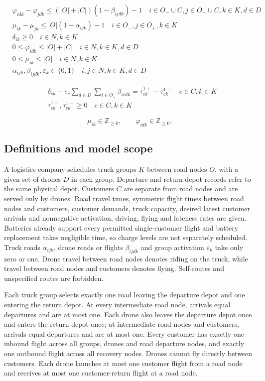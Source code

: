 \documentclass[10pt]{article}
\begin{document}
\begin{align}
& \varphi_{i d k}-\varphi_{j d k} \leq(|O|+|C|)(1-\beta_{i j d k})-1 \quad i \in O_{-} \cup C, j \in O_{+} \cup C, k \in K, d \in D \\
& \mu_{i k}-\mu_{j k} \leq|O|(1-\alpha_{i j k})-1 \quad i \in O_{-}, j \in O_{+}, k \in K \\
& \delta_{i k} \geq 0 \quad i \in N, k \in K \\
& 0 \leq \varphi_{i d k} \leq|O|+|C| \quad i \in N, k \in K, d \in D \\
& 0 \leq \mu_{i k} \leq|O| \quad i \in N, k \in K \\
& \alpha_{i j k}, \beta_{i j d k}, \varepsilon_{k} \in\{0,1\} \quad i, j \in N, k \in K, d \in D
\end{align}

\begin{align}
& \delta_{ck} - e_{c} \sum_{d \in D} \sum_{i \in O_{-}} \beta_{icdk} = \tau_{ck}^{1+} - \tau_{ck}^{1-} \quad c \in C, k \in K \\
& \tau_{ck}^{1+}, \tau_{ck}^{1-} \ge 0 \quad c \in C, k \in K
\end{align}

\[
\mu_{ik}\in\mathbb Z_{\ge0},\qquad \varphi_{idk}\in\mathbb Z_{\ge0}.
\]

\subsection*{Definitions and model scope}
A logistics company schedules truck groups $K$ between road nodes $O$, with a given set of drones $D$ in each group. Departure and return depot records refer to the same physical depot. Customers $C$ are separate from road nodes and are served only by drones. Road travel times, symmetric flight times between road nodes and customers, customer demands, truck capacity, desired latest customer arrivals and nonnegative activation, driving, flying and lateness rates are given. Batteries already support every permitted single-customer flight and battery replacement takes negligible time, so charge levels are not separately scheduled. Truck roads $\alpha_{ijk}$, drone roads or flights $\beta_{ijdk}$ and group activation $\varepsilon_k$ take only zero or one. Drone travel between road nodes denotes riding on the truck, while travel between road nodes and customers denotes flying. Self-routes and unspecified routes are forbidden.

Each truck group selects exactly one road leaving the departure depot and one entering the return depot. At every intermediate road node, arrivals equal departures and are at most one. Each drone also leaves the departure depot once and enters the return depot once; at intermediate road nodes and customers, arrivals equal departures and are at most one. Every customer has exactly one inbound flight across all groups, drones and road departure nodes, and exactly one outbound flight across all recovery nodes. Drones cannot fly directly between customers. Each drone launches at most one customer flight from a road node and receives at most one customer-return flight at a road node.
\end{document}
